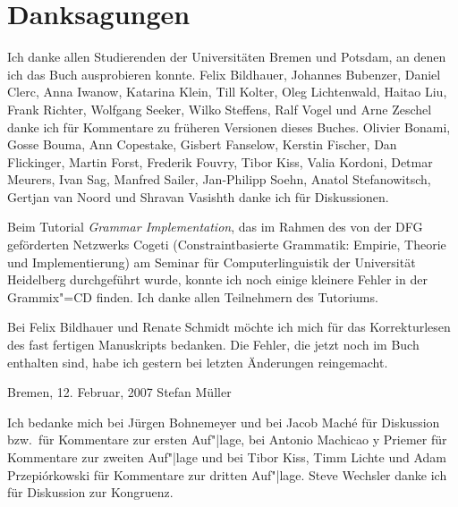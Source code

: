 
\chapter{Danksagungen}

Ich danke allen Studierenden der Universitäten Bremen und Potsdam, 
an denen ich das Buch ausprobieren konnte.
Felix Bildhauer,
Johannes Bubenzer, %
Daniel Clerc, %
Anna Iwanow, %
Katarina Klein, 
Till Kolter, 
Oleg Lichtenwald, 
Haitao Liu,
Frank Richter,
Wolfgang Seeker,
Wilko Steffens,
Ralf Vogel
und
Arne Zeschel
danke ich für Kommentare zu früheren Versionen dieses Buches.
Olivier Bonami, %
Gosse Bouma, 
Ann Copestake, 
Gisbert Fanselow, 
Kerstin Fischer, 
Dan Flickinger, 
Martin Forst,
Frederik Fouvry,
Tibor Kiss, 
Valia Kordoni, 
Detmar Meurers, 
Ivan Sag, 
Manfred Sailer,       %
Jan-Philipp Soehn,    %
Anatol Stefanowitsch,
Gertjan van Noord
und
Shravan Vasishth %
danke ich für Diskussionen.

Beim Tutorial \emph{Grammar Implementation}, das im Rahmen des von der DFG geförderten Netzwerks
Cogeti (Constraintbasierte Grammatik: Empirie, Theorie und Implementierung) am Seminar für
Computerlinguistik der Universität Heidelberg durchgeführt wurde,
konnte ich noch einige kleinere Fehler in der Grammix"=CD finden. Ich danke allen Teilnehmern des Tutoriums.

Bei Felix Bildhauer und Renate Schmidt möchte ich mich für das Korrekturlesen des fast fertigen
Manuskripts bedanken. Die Fehler, die jetzt noch im Buch enthalten sind, habe ich gestern bei
letzten Änderungen reingemacht.
~\medskip 

\noindent
Bremen, 12. Februar, 2007 \hfill Stefan Müller\\
\bigskip

\noindent
Ich bedanke mich bei Jürgen Bohnemeyer und bei Jacob Maché für Diskussion bzw.\ für Kommentare zur
ersten Auf"|lage, bei Antonio Machicao y Priemer für
Kommentare zur zweiten Auf"|lage und bei Tibor Kiss, Timm Lichte und Adam
Przepiórkowski für Kommentare zur dritten Auf"|lage. Steve Wechsler
danke ich für Diskussion zur Kongruenz.


